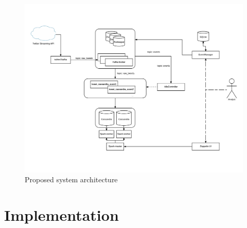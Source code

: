 \begin{figure}
\centering
\includegraphics[width=\textwidth]{Figures/SysArch}
\decoRule
\caption[System architecture]{Proposed system architecture}
\label{fig:SysArch}
\end{figure}

\section{Implementation}
